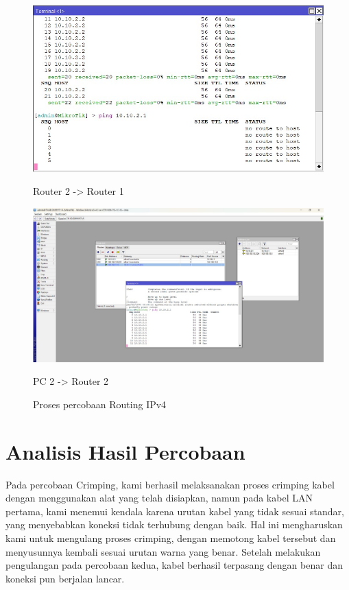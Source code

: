\begin{figure}[H]
  \centering
  \begin{minipage}[t]{0.48\textwidth}
    \centering
    \includegraphics[width=\linewidth]{P1/img/Router2->Router1.jpeg}
    \caption{Router 2 -> Router 1}
    \label{fig:router2router1}
  \end{minipage}
  \hfill
  \begin{minipage}[t]{0.48\textwidth}
    \centering
    \includegraphics[width=\linewidth]{P1/img/PC2->Router2.jpeg}
    \caption{PC 2 -> Router 2}
    \label{fig:pc2router2}
  \end{minipage}
  \caption*{Proses percobaan Routing IPv4}
\end{figure}

\newpage
\section{Analisis Hasil Percobaan}

Pada percobaan Crimping, kami berhasil melaksanakan proses crimping kabel dengan menggunakan alat yang telah disiapkan, namun pada kabel LAN pertama, kami menemui kendala karena urutan kabel yang tidak sesuai standar, yang menyebabkan koneksi tidak terhubung dengan baik. Hal ini mengharuskan kami untuk mengulang proses crimping, dengan memotong kabel tersebut dan menyusunnya kembali sesuai urutan warna yang benar. Setelah melakukan pengulangan pada percobaan kedua, kabel berhasil terpasang dengan benar dan koneksi pun berjalan lancar.

